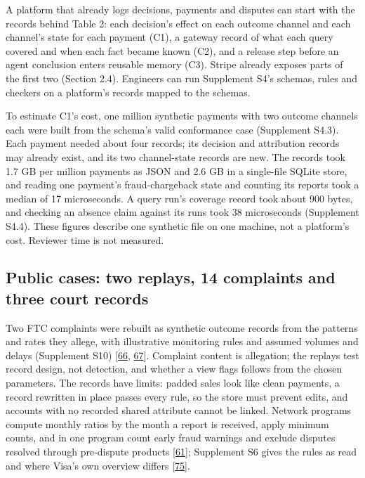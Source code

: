 \documentclass[acmlarge,nonacm]{acmart}
\begin{document}
A platform that already logs decisions, payments and disputes can start
with the records behind Table 2: each decision's effect on each outcome
channel and each channel's state for each payment (C1), a gateway record
of what each query covered and when each fact became known (C2), and a
release step before an agent conclusion enters reusable memory (C3).
Stripe already exposes parts of the first two (Section 2.4). Engineers
can run Supplement S4's schemas, rules and checkers on a platform's
records mapped to the schemas.

To estimate C1's cost, one million synthetic payments with two outcome
channels each were built from the schema's valid conformance case
(Supplement S4.3). Each payment needed about four records; its decision
and attribution records may already exist, and its two channel-state
records are new. The records took 1.7 GB per million payments as JSON
and 2.6 GB in a single-file SQLite store, and reading one payment's
fraud-chargeback state and counting its reports took a median of 17
microseconds. A query run's coverage record took about 900 bytes, and
checking an absence claim against its runs took 38 microseconds
(Supplement S4.4). These figures describe one synthetic file on one
machine, not a platform's cost. Reviewer time is not measured.

\hypertarget{public-cases-two-replays-14-complaints-and-three-court-records}{%
\subsection{Public cases: two replays, 14 complaints and three court
records}\label{public-cases-two-replays-14-complaints-and-three-court-records}}

Two FTC complaints were rebuilt as synthetic outcome records from the
patterns and rates they allege, with illustrative monitoring rules and
assumed volumes and delays (Supplement S10)
{[}\protect\hyperlink{ref-FTC2020FirstData}{66},
\protect\hyperlink{ref-FTC2019Allied}{67}{]}. Complaint content is
allegation; the replays test record design, not detection, and whether a
view flags follows from the chosen parameters. The records have limits:
padded sales look like clean payments, a record rewritten in place
passes every rule, so the store must prevent edits, and accounts with no
recorded shared attribute cannot be linked. Network programs compute
monthly ratios by the month a report is received, apply minimum counts,
and in one program count early fraud warnings and exclude disputes
resolved through pre-dispute products
{[}\protect\hyperlink{ref-Stripe2026MonitoringPrograms}{61}{]};
Supplement S6 gives the rules as read and where Visa's own overview
differs {[}\protect\hyperlink{ref-Visa2025VAMP}{75}{]}.
\end{document}
